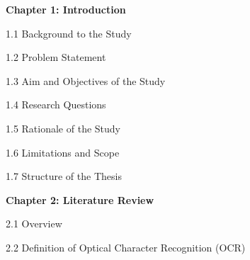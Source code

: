 \begin{adjustwidth}{0.2cm}{0.2cm}
    \vspace{0.5cm}
    {\large \textbf{Chapter 1: Introduction}\dotfill\pageref{ch:intro}\par}
    {\large 1.1 Background to the Study\dotfill\pageref{sec:background}\par}
    {\large 1.2 Problem Statement\dotfill\pageref{sec:problem}\par}
    {\large 1.3 Aim and Objectives of the Study\dotfill\pageref{sec:objectives}\par}
    {\large 1.4 Research Questions\dotfill\pageref{sec:questions}\par}
    {\large 1.5 Rationale of the Study\dotfill\pageref{sec:rationale}\par}
    {\large 1.6 Limitations and Scope\dotfill\pageref{sec:limitations}\par}
    {\large 1.7 Structure of the Thesis\dotfill\pageref{sec:structure}\par}

    \vspace{0.5cm}
    {\large \textbf{Chapter 2: Literature Review}\dotfill\pageref{ch:literature}\par}
    {\large 2.1 Overview\dotfill\pageref{sec:ocr-overview}\par}
    {\large 2.2 Definition of Optical Character Recognition (OCR)\dotfill\pageref{sec:ocr-definition}\par}


\end{adjustwidth}
